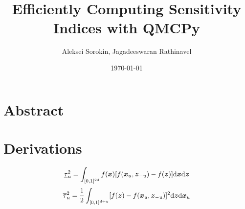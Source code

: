 \documentclass{article}
\title{Efficiently Computing Sensitivity Indices with QMCPy}
\author{Aleksei Sorokin, Jagadeeswaran Rathinavel}
\date{\today}
\begin{document}
\maketitle

\section{Abstract}

\cite{reliable_sobol_indices_approx, QMCPy, mcbook}

\section{Derivations}

\begin{equation}
    \underline{\tau}_u^2 = \int_{[0,1]^{2d}} f(\boldsymbol{x})[f(\boldsymbol{x}_u,\boldsymbol{z}_{-u})-f(\boldsymbol{z})]\mathrm{d}\boldsymbol{x}\mathrm{d}\boldsymbol{z}
    \label{eq:si_closed}
\end{equation}
\begin{equation}
    \overline{\tau}_u^2 = \frac{1}{2}\int_{[0,1]^{d+u}} [f(\boldsymbol{z})-f(\boldsymbol{x}_u,\boldsymbol{z}_{-u})]^2\mathrm{d}\boldsymbol{z}\mathrm{d}\boldsymbol{x}_u
    \label{eq:si_total}
\end{equation}

\printbibliography
\end{document}
